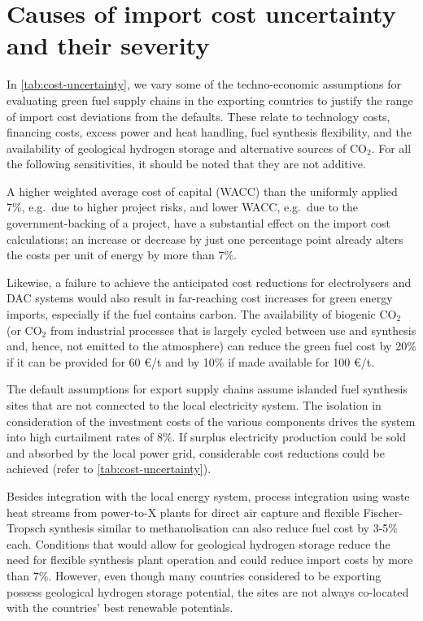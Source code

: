 
\section*{Causes of import cost uncertainty and their severity}

In \cref{tab:cost-uncertainty}, we vary some of the techno-economic assumptions
for evaluating green fuel supply chains in the exporting countries to justify
the range of import cost deviations from the defaults. These relate to
technology costs, financing costs, excess power and heat handling, fuel
synthesis flexibility, and the availability of geological hydrogen storage and
alternative sources of CO$_2$. For all the following sensitivities, it should be
noted that they are not additive.

A higher weighted average cost of capital (WACC) than the uniformly applied 7\%,
e.g.~due to higher project risks, and lower WACC, e.g.~due to the
government-backing of a project, have a substantial effect on the import cost
calculations; an increase or decrease by just one percentage point already
alters the costs per unit of energy by more than
7\%.\cite{egliBiasEnergy2019,bogdanovReplyBias2019,lonerganImprovingRepresentation2023a,schyskaHowRegional2020,steffenDeterminantsCost2022}

Likewise, a failure to achieve the anticipated cost reductions for electrolysers
and DAC systems would also result in far-reaching cost increases for green
energy imports, especially if the fuel contains carbon. The availability of
biogenic CO$_2$ (or CO$_2$ from industrial processes that is largely cycled
between use and synthesis and, hence, not emitted to the atmosphere) can reduce
the green fuel cost by 20\% if it can be provided for 60 \euro{}/t and by 10\%
if made available for 100 \euro{}/t.

The default assumptions for export supply chains assume islanded fuel synthesis
sites that are not connected to the local electricity system. The isolation in
consideration of the investment costs of the various components drives the
system into high curtailment rates of 8\%. If surplus electricity production
could be sold and absorbed by the local power grid, considerable cost reductions
could be achieved (refer to \cref{tab:cost-uncertainty}).

Besides integration with the local energy system, process integration using
waste heat streams from power-to-X plants for direct air capture and flexible
Fischer-Tropsch synthesis similar to methanolisation can also reduce fuel cost
by 3-5\% each. Conditions that would allow for geological hydrogen storage
reduce the need for flexible synthesis plant operation and could reduce import
costs by more than 7\%. However, even though many countries considered to be
exporting possess geological hydrogen storage potential, the sites are not
always co-located with the countries' best renewable potentials.
\cite{hevinUndergroundStorage2019}

